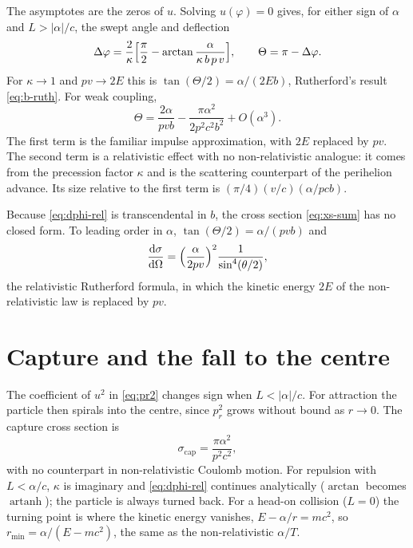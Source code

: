 \documentclass[11pt,a4paper]{book}
\numberwithin{equation}{chapter}
\newcommand{\dd}{\mathrm{d}}
\newcommand{\artanh}{\operatorname{artanh}}
\newcommand{\dsdO}{\frac{\dd\sigma}{\dd\Omega}}
\begin{document}
The asymptotes are the zeros of $u$. Solving $u(\varphi)=0$ gives, for either
sign of $\alpha$ and $L>|\alpha|/c$, the swept angle and deflection
\begin{equation}\label{eq:dphi-rel}
  \Delta\varphi=\frac2\kappa\Bigl[\frac\pi2-\arctan\frac{\alpha}{\kappa\,b\,p\,v}\Bigr],
  \qquad\Theta=\pi-\Delta\varphi .
\end{equation}
For $\kappa\to1$ and $pv\to2E$ this is $\tan(\Theta/2)=\alpha/(2Eb)$,
Rutherford's result \eqref{eq:b-ruth}. For weak coupling,
\begin{equation}\label{eq:theta-exp}
  \Theta=\frac{2\alpha}{pvb}-\frac{\pi\alpha^2}{2p^2c^2b^2}+O(\alpha^3).
\end{equation}
The first term is the familiar impulse approximation, with $2E$ replaced by
$pv$. The second term is a relativistic effect with no non-relativistic
analogue: it comes from the precession factor $\kappa$ and is the scattering
counterpart of the perihelion advance. Its size relative to the first term is
$(\pi/4)(v/c)(\alpha/pcb)$.

Because \eqref{eq:dphi-rel} is transcendental in $b$, the cross section
\eqref{eq:xs-sum} has no closed form. To leading order in $\alpha$,
$\tan(\Theta/2)=\alpha/(pvb)$ and
\begin{equation}\label{eq:ruth-rel}
  \dsdO=\Bigl(\frac{\alpha}{2pv}\Bigr)^{2}\frac1{\sin^4(\theta/2)},
\end{equation}
the relativistic Rutherford formula, in which the kinetic energy $2E$ of the
non-relativistic law is replaced by $pv$.

\section{Capture and the fall to the centre}\label{sec:capture}

The coefficient of $u^2$ in \eqref{eq:pr2} changes sign when $L<|\alpha|/c$. For
attraction the particle then spirals into the centre, since $p_r^2$ grows
without bound as $r\to0$. The capture cross section is
\begin{equation}\label{eq:cap-rel}
  \sigma_{\mathrm{cap}}=\frac{\pi\alpha^2}{p^2c^2},
\end{equation}
with no counterpart in non-relativistic Coulomb motion. For repulsion with
$L<\alpha/c$, $\kappa$ is imaginary and \eqref{eq:dphi-rel} continues
analytically ($\arctan$ becomes $\artanh$); the particle is always turned back.
For a head-on collision ($L=0$) the turning point is where the kinetic energy
vanishes, $E-\alpha/r=mc^2$, so $r_{\min}=\alpha/(E-mc^2)$, the same as the
non-relativistic $\alpha/T$.
\end{document}
